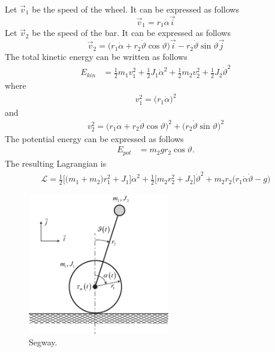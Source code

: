 \documentclass[11pt,a4paper,oneside]{book}
\numberwithin{equation}{section}
\theoremstyle{it}
\theoremstyle{definition}
\begin{document}
Let $\vec{v}_1$ be the speed of the wheel. It can be expressed as follows
\begin{equation}\label{segway_eq_3}
	\vec{v}_1 = r_1\dot{\alpha}\vec{i}
\end{equation}
Let $\vec{v}_2$ be the speed of the bar. It can be expressed as follows
\begin{equation}\label{segway_eq_4}
	\vec{v}_2 = \Big(r_1\dot{\alpha} + 
	r_2\dot{\vartheta}\cos\vartheta\Big)\vec{i}- 
	r_2\dot{\vartheta}\sin\vartheta\vec{j}
\end{equation}
The total kinetic energy can be written as follows
\begin{equation}\label{segway_eq_5}
	\begin{aligned}
		E_{kin}&=\frac{1}{2}m_1v_1^2+\frac{1}{2}J_1\dot{\alpha}^2+
		\frac{1}{2}m_2v_2^2+\frac{1}{2}J_2\dot{\vartheta}^2
	\end{aligned}
\end{equation}
where 
\begin{equation}\label{segway_eq_5}
	\begin{aligned}
		v_1^2 = \big(r_1\dot{\alpha}\big)^2
	\end{aligned}
\end{equation}
and
\begin{equation}\label{segway_eq_5}
	\begin{aligned}
		v_2^2 = \big(r_1\dot{\alpha} + 
		r_2\dot{\vartheta}\cos\vartheta\big)^2+\big(r_2\dot{\vartheta}\sin\vartheta\big)^2
	\end{aligned}
\end{equation}
The potential energy can be expressed as follows
\begin{equation}\label{segway_eq_6}
	\begin{aligned}
		E_{pot}&=m_2gr_2\cos\vartheta.
	\end{aligned}
\end{equation}
The resulting Lagrangian is
\begin{equation}\label{segway_eq_7}
	\begin{aligned}
		\mathcal{L}=\frac{1}{2}\Big[\big(m_1+m_2\big)r_1^2+J_1\Big]\dot{\alpha}^2
		+ \frac{1}{2}\Big[m_2r_2^2+J_2\Big]\dot{\vartheta}^2 + 
		m_2r_2\big(r_1\dot{\alpha} \dot{\vartheta}-g\big)
	\end{aligned}
\end{equation}
\begin{figure}[H]
	\centering
	\includegraphics[width = 175pt, 
	keepaspectratio,angle=0]{figures/segway/segway.eps}
	\captionsetup{width=0.5\textwidth, font=small}		
	\caption{Segway.}
	\label{figure_segway_1}
\end{figure}
\end{document}
